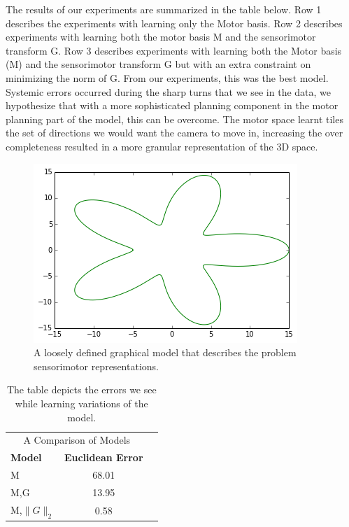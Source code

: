 \documentclass[conference]{IEEEtran}
\begin{document}
The results of our experiments are summarized in the table below. Row 1 describes the experiments with learning only the Motor basis. Row 2 describes experiments with learning both the motor basis M and the sensorimotor transform G. Row 3 describes experiments with learning both the Motor basis (M) and the sensorimotor transform G but with an extra constraint on minimizing the norm of G. From our experiments, this was the best model. Systemic errors occurred during the sharp turns that we see in the data, we hypothesize that with a more sophisticated planning component in the motor planning part of the model, this can be overcome. The motor space learnt tiles the set of directions we would want the camera to move in, increasing the over completeness resulted in a more granular representation of the 3D space.

\begin{figure}
\includegraphics[scale=0.6]{train1.png}
\caption{A loosely defined graphical model that describes the problem sensorimotor representations. }
\end{figure}

\begin{table}[htbp]
   \centering
   \begin{tabular}{@{} lcr @{}} %
      \multicolumn{2}{c}{A Comparison of Models } \\
      \textbf{Model}    & \textbf{Euclidean Error} \\
      \hline
      M      & 68.01 \\                
      M,G       &  13.95 \\
      M,$\|G\|_{2}$       & 0.58 \\
      
   \end{tabular}
   \caption{The table depicts the errors we see while learning variations of the model.}
   \label{tab:booktabs}
\end{table}
\end{document}
